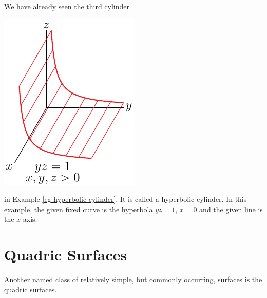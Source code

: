 \begin{eg}
We have already seen the third cylinder 
\begin{efig}
\begin{center}
   \includegraphics{hyperbolicCylinderD.pdf}
\end{center}
\end{efig}
in Example \ref{eg hyperbolic cylinder}. It is called a hyperbolic cylinder.
In this example, the given fixed curve is the hyperbola $yz=1$, $x=0$
and the given line is the $x$-axis.
\end{eg}


\section{Quadric Surfaces}\label{sec quadrics}


Another named class of relatively simple, but commonly occurring, 
surfaces is the quadric surfaces.

